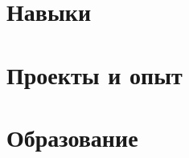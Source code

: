 \documentclass[letter,10pt]{article}
\begin{document}


\section{Навыки}


\section{Проекты и опыт}


\section{Образование}



%
\end{document}
